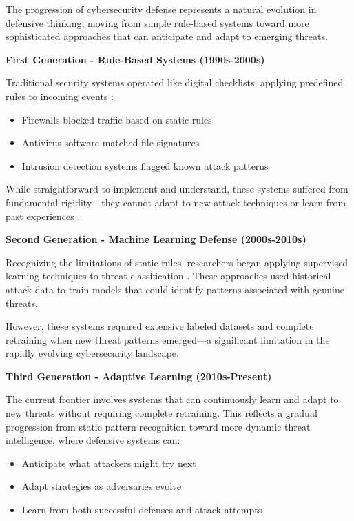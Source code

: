 \documentclass[12pt,twoside]{article}
\theoremstyle{definition}
\theoremstyle{plain}
\begin{document}
The progression of cybersecurity defense represents a natural evolution in defensive thinking, moving from simple rule-based systems toward more sophisticated approaches that can anticipate and adapt to emerging threats.

\textbf{First Generation - Rule-Based Systems (1990s-2000s)}

Traditional security systems operated like digital checklists, applying predefined rules to incoming events \citep{alpcan2010network}:
\begin{itemize}
    \item Firewalls blocked traffic based on static rules
    \item Antivirus software matched file signatures
    \item Intrusion detection systems flagged known attack patterns
\end{itemize}

While straightforward to implement and understand, these systems suffered from fundamental rigidity—they cannot adapt to new attack techniques or learn from past experiences \citep{sommer2010outside}.

\textbf{Second Generation - Machine Learning Defense (2000s-2010s)}

Recognizing the limitations of static rules, researchers began applying supervised learning techniques to threat classification \citep{sommer2010outside}. These approaches used historical attack data to train models that could identify patterns associated with genuine threats. 

However, these systems required extensive labeled datasets and complete retraining when new threat patterns emerged—a significant limitation in the rapidly evolving cybersecurity landscape.

\textbf{Third Generation - Adaptive Learning (2010s-Present)}

The current frontier involves systems that can continuously learn and adapt to new threats without requiring complete retraining. This reflects a gradual progression from static pattern recognition toward more dynamic threat intelligence, where defensive systems can:
\begin{itemize}
    \item Anticipate what attackers might try next
    \item Adapt strategies as adversaries evolve
    \item Learn from both successful defenses and attack attempts
\end{itemize}
\end{document}
